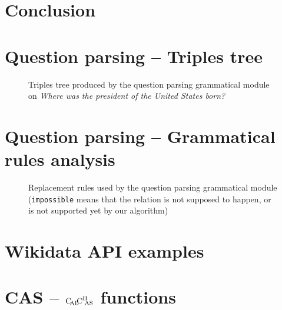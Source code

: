 \documentclass[a4paper,10pt]{report}
\begin{document}
\chapter*{Conclusion}
    \label{conclusion}
    



\nocite{*}

\appendix

\chapter{Question parsing \--- Triples tree}

\begin{figure}[!ht]

\caption{Triples tree produced by the question parsing grammatical module on \textit{Where was the president of the United States born?}}
\label{triple_tree}
\end{figure}

\chapter{Question parsing \--- Grammatical rules analysis}

\begin{figure}[!ht]

\caption{Replacement rules used by the question parsing grammatical module (\texttt{impossible} means that the relation is not supposed to happen, or is not supported yet by our algorithm)}
\label{gramm_rule}
\end{figure}

\chapter{Wikidata API examples}


\chapter{CAS \--- \texorpdfstring{$\text{C}\hspace{-2pt}_{\text{AL}}\hspace{-3pt}\text{C}^{\text{H}}{\hspace{-4pt}}_\text{AS}$}{CalChAS} functions}
    
\end{document}
